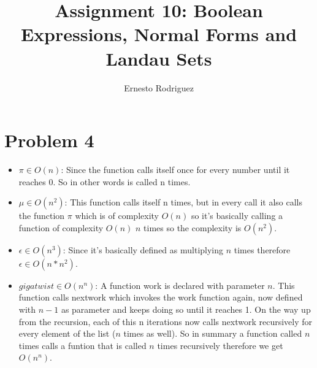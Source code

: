 \documentclass[11pt]{article}
\author{Ernesto Rodriguez}
\title{Assignment 10: Boolean Expressions, Normal Forms and Landau Sets}
\begin{document}
\maketitle

\section{Problem 4}

\begin{itemize}
  \item{$\pi \in O(n)$: Since the function calls itself once for every number until it reaches 0. So in other words is called n times.}
  \item{$\mu \in O(n^2)$: This function calls itself n times, but in every call it also calls the function $\pi$ which is of complexity $O(n)$ so it's basically calling a function of complexity $O(n)$ $n$ times so the complexity is $O(n^2)$.}
  \item{$\epsilon \in O(n^3)$: Since it's basically defined as multiplying $n$ times therefore $\epsilon \in O(n*n^2)$.}
  \item{$gigatwist \in O(n^n)$: A function work is declared with parameter $n$. This function calls nextwork which invokes the work function again, now defined with $n-1$ as parameter and keeps doing so until it reaches 1. On the way up from the recursion, each of this n iterations now calls nextwork recursively for every element of the list ($n$ times as well). So in summary a function called $n$ times calls a funtion that is called $n$ times recursively therefore we get $O(n^n)$.}
\end{itemize}
\end{document}

